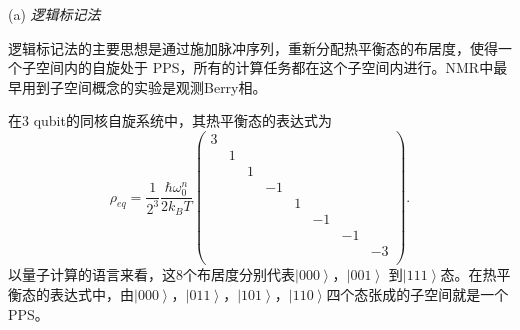(a) \emph{逻辑标记法}

逻辑标记法\cite{nmrpro2,pps4}的主要思想是通过施加脉冲序列，重新分配热平衡态的布居度，使得一个子空间内的自旋处于
PPS，所有的计算任务都在这个子空间内进行。NMR中最早用到子空间概念的实验是观测Berry相\cite{pps5}。

在3 qubit的同核自旋系统中，其热平衡态的表达式为
\begin{equation}\label{aaa}
\rho_{eq} = \frac{1}{2^3}\frac{\hbar \omega_0^n}{2k_BT}\left(
                                                         \begin{array}{cccccccc}
                                                           3 &  &  &  &  &  &  &  \\
                                                            & 1 &   &   &   &   &   &   \\
                                                             &   & 1 &   &   &   &   &   \\
                                                             &   &   & -1 &   &   &   &   \\
                                                             &   &   &   & 1 &   &   &   \\
                                                             &   &   &   &   & -1 &   &   \\
                                                             &   &   &   &   &   & -1 &   \\
                                                             &   &   &   &   &   &   & -3 \\
                                                         \end{array}
                                                       \right).
\end{equation}
以量子计算的语言来看，这8个布居度分别代表$\left\vert 000 \right \rangle$，$\left\vert 001 \right \rangle$ 到$\left\vert 111 \right \rangle$态。在热平衡态的表达式中，由$\left\vert 000 \right \rangle$，$\left\vert 011 \right \rangle$，$\left\vert 101 \right \rangle$，$\left\vert 110 \right \rangle$四个态张成的子空间就是一个PPS。

